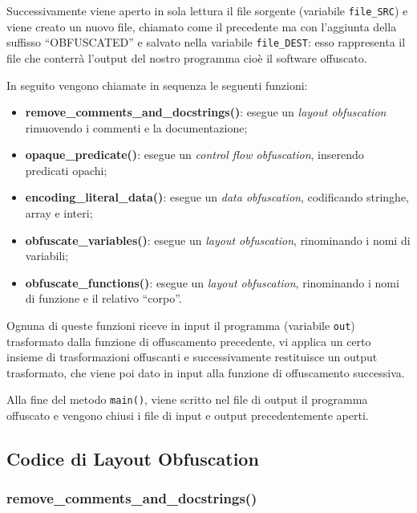 \documentclass[a4paper,oneside,openright,titlepage,10pt,footinclude,headinclude]{scrbook}
\begin{document}
Successivamente viene aperto in sola lettura il file sorgente (variabile \texttt{file\_SRC}) e viene creato un nuovo file, chiamato come il precedente ma con l'aggiunta della suffisso ``OBFUSCATED''  e salvato nella variabile \texttt{file\_DEST}: esso rappresenta il file che conterrà l'output del nostro programma cioè il software offuscato.\smallskip

\noindent In seguito vengono chiamate in sequenza le seguenti funzioni:
\begin{itemize}
\item
\textbf{remove\_comments\_and\_docstrings()}: esegue un \emph{layout obfuscation} rimuovendo i commenti e la documentazione;
\item
\textbf{opaque\_predicate()}: esegue un \emph{control flow obfuscation}, inserendo predicati opachi; 
\item
\textbf{encoding\_literal\_data()}: esegue un \emph{data obfuscation}, codificando stringhe, array e interi;
\item
\textbf{obfuscate\_variables()}: esegue un \emph{layout obfuscation}, rinominando i nomi di variabili;
  \item
\textbf{obfuscate\_functions()}: esegue un \emph{layout obfuscation}, rinominando i nomi di funzione e il relativo ``corpo''.
\end{itemize}
Ognuna di queste funzioni riceve in input il programma (variabile \texttt{out}) trasformato dalla funzione di offuscamento precedente, vi applica un certo insieme di trasformazioni offuscanti e successivamente restituisce un output trasformato, che viene poi dato in input alla funzione di offuscamento successiva.\smallskip

Alla fine del metodo \texttt{main()}, viene scritto nel file di output il programma offuscato  e vengono chiusi i file di input e output precedentemente aperti.


\subsection{Codice di Layout Obfuscation}

\subsubsection{remove\_comments\_and\_docstrings()}
\end{document}
